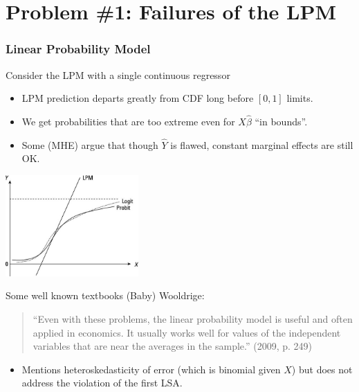 \documentclass[xcolor=pdftex,dvipsnames,table,mathserif,aspectratio=169]{beamer}
\begin{document}
\section*{Problem \#1: Failures of the LPM}
\begin{frame}
\frametitle{Linear Probability Model}
Consider the LPM with a single continuous regressor
\begin{itemize}
\item LPM prediction departs greatly from CDF long before $[0,1]$ limits.
\item We get probabilities that are too extreme even for $X\hat{\beta}$ ``in bounds''.
\item Some (MHE) argue that though $\hat{Y}$ is flawed, constant marginal effects are still OK.
\end{itemize}
\begin{center}
\includegraphics[width=2in]{resources/lpm-probit.jpg}
\end{center}
\end{frame}

\begin{frame}{Some well known textbooks}
(Baby) Wooldrige:
\begin{quote}
``Even with these problems, the linear probability model is useful and often applied in economics. It usually works well for values of the independent variables that are near the averages in the sample.'' (2009, p. 249)
\end{quote}
\begin{itemize}
\item Mentions heteroskedasticity of error (which is binomial given $X$) but does not address the violation of the first LSA.
\end{itemize}
\end{frame}
\end{document}
